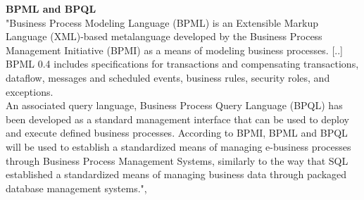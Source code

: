 \documentclass[12pt]{article}
\begin{document}
\textbf{BPML and BPQL} \\
"Business Process Modeling Language (BPML) is an Extensible Markup Language (XML)-based metalanguage developed by the Business Process Management Initiative (BPMI) as a means of modeling business processes. [..] BPML 0.4 includes specifications for transactions and compensating transactions, dataflow, messages and scheduled events, business rules, security roles, and exceptions. \\ An associated query language, Business Process Query Language (BPQL) has been developed as a standard management interface that can be used to deploy and execute defined business processes. According to BPMI, BPML and BPQL will be used to establish a standardized means of managing e-business processes through Business Process Management Systems, similarly to the way that SQL established a standardized means of managing business data through packaged database management systems.", \cite{bpmldefmr}
\end{document}
